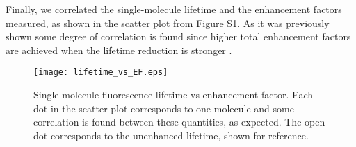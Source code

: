 \documentclass[11pt,a4paper,onecolumn]{article}
\begin{document}
Finally, we correlated the single-molecule lifetime and the enhancement factors measured, as shown in the scatter plot from Figure S\ref{fg:lifetime_vs_EF}. As it was previously shown some degree of correlation is found since higher total enhancement factors are achieved when the lifetime reduction is stronger \cite{khatua2014resonant}. 


\begin{figure}
  \centering
  \texttt{[image: lifetime\_vs\_EF.eps]}
	\makeatletter
	\renewcommand{\fnum@figure}{\figurename~S\thefigure}
	\makeatother
  \caption{Single-molecule fluorescence lifetime vs enhancement factor. Each dot in the scatter plot corresponds to one molecule and some correlation is found between these quantities, as expected. The open dot corresponds to the unenhanced lifetime, shown for reference. 
	}
  \label{fg:lifetime_vs_EF}
\end{figure}





\pagebreak

\end{document}

